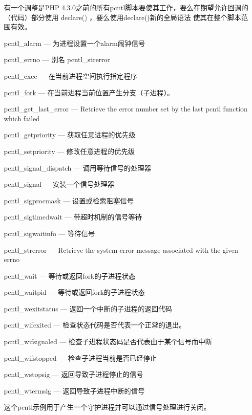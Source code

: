 有一个调整是PHP 4.3.0之前的所有pcntl脚本要使其工作，要么在期望允许回调的（代码）部分使用 declare() ，要么使用declare()新的全局语法 使其在整个脚本范围有效。

\begin{compactitem}
\item pcntl\_alarm — 为进程设置一个alarm闹钟信号
\item pcntl\_errno — 别名 pcntl\_strerror
\item pcntl\_exec — 在当前进程空间执行指定程序
\item pcntl\_fork — 在当前进程当前位置产生分支（子进程）。
\item pcntl\_get\_last\_error — Retrieve the error number set by the last pcntl function which failed
\item pcntl\_getpriority — 获取任意进程的优先级
\item pcntl\_setpriority — 修改任意进程的优先级
\item pcntl\_signal\_dispatch — 调用等待信号的处理器
\item pcntl\_signal — 安装一个信号处理器
\item pcntl\_sigprocmask — 设置或检索阻塞信号
\item pcntl\_sigtimedwait — 带超时机制的信号等待
\item pcntl\_sigwaitinfo — 等待信号
\item pcntl\_strerror — Retrieve the system error message associated with the given errno
\item pcntl\_wait — 等待或返回fork的子进程状态
\item pcntl\_waitpid — 等待或返回fork的子进程状态
\item pcntl\_wexitstatus — 返回一个中断的子进程的返回代码
\item pcntl\_wifexited — 检查状态代码是否代表一个正常的退出。
\item pcntl\_wifsignaled — 检查子进程状态码是否代表由于某个信号而中断
\item pcntl\_wifstopped — 检查子进程当前是否已经停止
\item pcntl\_wstopsig — 返回导致子进程停止的信号
\item pcntl\_wtermsig — 返回导致子进程中断的信号
\end{compactitem}


这个pcntl示例用于产生一个守护进程并可以通过信号处理进行关闭。



